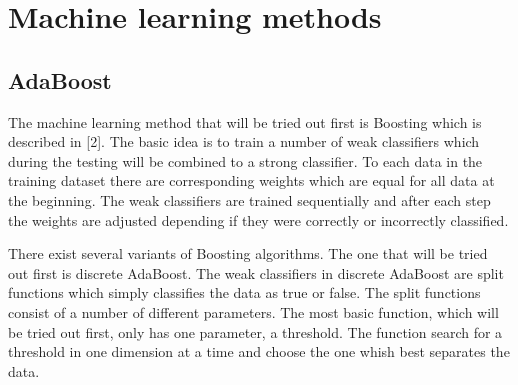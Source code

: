 \chapter{Machine learning methods}
\label{sec:Machine learning methods}

\section{AdaBoost}
\label{sec:AdaBoost}
The machine learning method that will be tried out first is Boosting which is described in [2]. The basic idea is to train a number of weak classifiers which during the testing will be combined to a strong classifier. To each data in the training dataset there are corresponding weights which are equal for all data at the beginning. The weak classifiers are trained sequentially and after each step the weights are adjusted depending if they were correctly or incorrectly classified.

There exist several variants of Boosting algorithms. The one that will be tried out first is discrete AdaBoost. The weak classifiers in discrete AdaBoost are split functions which simply classifies the data as true or false. The split functions consist of a number of different parameters. The most basic function, which will be tried out first, only has one parameter, a threshold. The function search for a threshold in one dimension at a time and choose the one whish best separates the data. 
